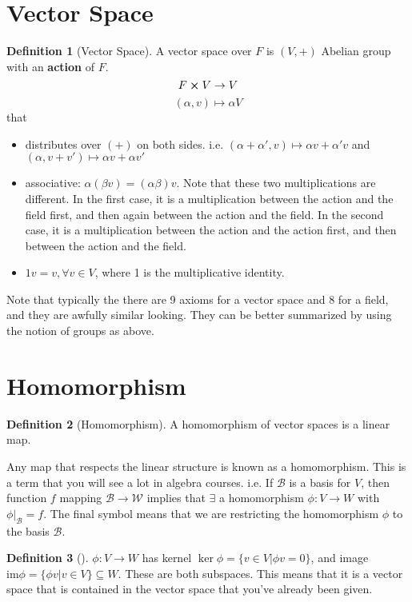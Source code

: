 \documentclass[12pt, a4paper, openany]{report}
\theoremstyle{definition}
\newtheorem{defn}{Definition}
\theoremstyle{remark}
\begin{document}
\section{Vector Space}
\begin{defn}[Vector Space]
    A vector space over \( F \) is \( (V, +) \) Abelian group with an \textbf{action} of \( F \).
    \[ F \cross V \rightarrow V \]
    \[ (\alpha, v) \mapsto \alpha V \] that
    \begin{itemize}
        \item distributes over \( (+) \) on both sides. i.e. \( (\alpha + \alpha', v) \mapsto \alpha v + \alpha' v \) and \( (\alpha, v + v') \mapsto \alpha v + \alpha v' \)
        \item associative: \( \alpha (\beta v) = (\alpha \beta) v\). Note that these two multiplications are different. In the first case, it is a multiplication between the action and the field first, and then again between the action and the field. In the second case, it is a multiplication between the action and the action first, and then between the action and the field.
        \item \( 1v = v,  \forall  v \in  V \), where 1 is the multiplicative identity.
    \end{itemize}
\end{defn}

Note that typically the there are 9 axioms for a vector space and 8 for a field, and they are awfully similar looking. They can be better summarized by using the notion of groups as above.

\section{Homomorphism}
\begin{defn}[Homomorphism]
    A homomorphism of vector spaces is a linear map.
\end{defn}

Any map that respects the linear structure is known as a homomorphism. This is a term that you will see a lot in algebra courses.
i.e. If \( \mathcal{B} \) is a basis for \( V \), then function \( f \) mapping \( \mathcal{B} \rightarrow \mathcal{W} \) implies
that \( \exists \) a homomorphism \( \phi : V \rightarrow W \) with \( \phi|_\mathcal{B} = f \). The final symbol means that we are restricting
the homomorphism \( \phi \) to the basis \( \mathcal{B} \).

\begin{defn}[]
    \( \phi: V \rightarrow W \) has kernel \( \ker \phi = \{ v \in  V | \phi v = 0\} \), and image \( \mathrm{im} \phi = \{ \phi v | v \in  V \} \subseteq W \). These are both subspaces. This means that it is a vector space that is contained in the vector space that you've already been given.
\end{defn}
\end{document}
